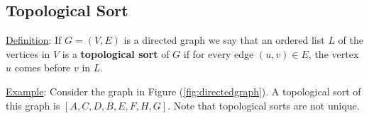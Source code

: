 \documentclass[10pt]{extarticle}
\begin{document}
\subsection{Topological Sort}

\underline{Definition}: If $G = (V, E)$ is a directed graph we say that an ordered list $L$ of the vertices in $V$ is a \textbf{topological sort} of $G$ if for every edge $(u, v) \in E$, the vertex $u$ comes before $v$ in $L$.

\underline{Example}: Consider the graph in Figure (\ref{fig:directedgraph}). A topological sort of this graph is $[A, C, D, B, E, F, H, G]$.
Note that topological sorts are not unique.
\end{document}
